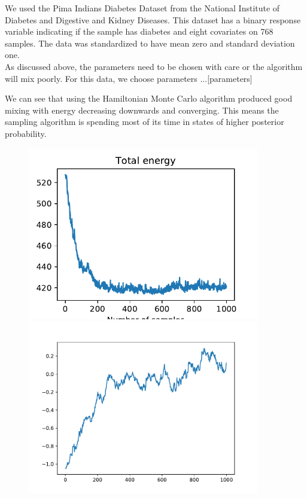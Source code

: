 We used the Pima Indians Diabetes Dataset from the National Institute of Diabetes and Digestive and Kidney Diseases. This dataset has a binary response variable indicating if the sample has diabetes and eight covariates on 768 samples. The data was standardized to have mean zero and standard deviation one.\\

As discussed above, the parameters need to be chosen with care or the algorithm will mix poorly. For this data, we choose parameters ...[parameters]

We can see that using the Hamiltonian Monte Carlo algorithm produced good mixing with energy decreasing downwards and converging. This means the sampling algorithm is spending most of its time in states of higher posterior probability.

\begin{figure}[H]
	\centering
	\begin{minipage}{0.45\textwidth}
		\centering
		\includegraphics[width=0.9\textwidth]{hmc-energy-pima.pdf} %
	\end{minipage}\hfill
	\begin{minipage}{0.45\textwidth}
		\centering
		\includegraphics[width=0.9\textwidth]{hmc-trace-pima.pdf} %
	\end{minipage}
\end{figure}

